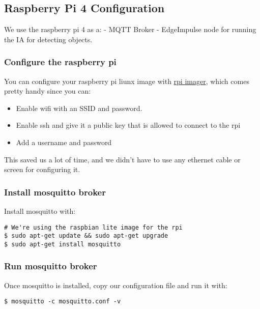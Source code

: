 \subsection{Raspberry Pi 4 Configuration}\label{raspberry-pi-4-configuration}

We use the raspberry pi 4 as a: - MQTT Broker - EdgeImpulse node for
running the IA for detecting objects.

\subsubsection{Configure the raspberry pi}\label{configure-the-raspberry-pi}

You can configure your raspberry pi liunx image with
\href{https://github.com/raspberrypi/rpi-imager}{rpi imager}, which
comes pretty handy since you can:

\begin{itemize}
\item
  Enable wifi with an SSID and password.
\item
  Enable ssh and give it a public key that is allowed to connect to the
  rpi
\item
  Add a username and password
\end{itemize}

This saved us a lot of time, and we didn't have to use any ethernet
cable or screen for configuring it.

\subsubsection{Install mosquitto broker}\label{install-mosquitto-broker}

Install mosquitto with:

\begin{verbatim}
# We're using the raspbian lite image for the rpi
$ sudo apt-get update && sudo apt-get upgrade
$ sudo apt-get install mosquitto
\end{verbatim}

\subsubsection{Run mosquitto broker}\label{run-mosquitto-broker}

Once mosquitto is installed, copy our configuration file and run it
with:

\begin{verbatim}
$ mosquitto -c mosquitto.conf -v
\end{verbatim}

